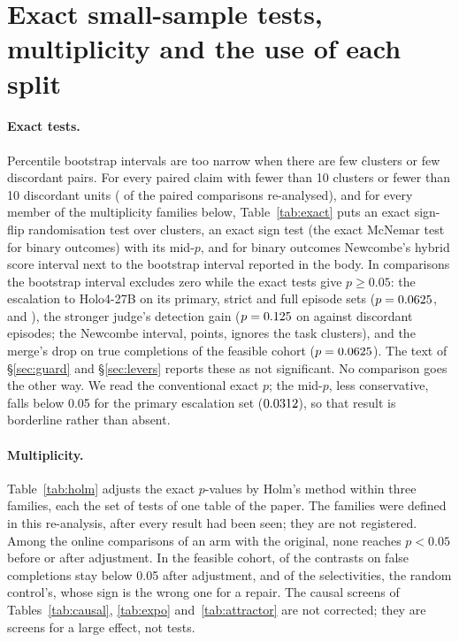 \section{Exact small-sample tests, multiplicity and the use of each split}
\label{app:exact}
\paragraph{Exact tests.} Percentile bootstrap intervals are too narrow when there are few clusters or few discordant pairs. For every paired claim with fewer than 10 clusters or fewer than 10 discordant units (\exNSmall{} of the \exNRows{} paired comparisons re-analysed), and for every member of the multiplicity families below, Table~\ref{tab:exact} puts an exact sign-flip randomisation test over clusters, an exact sign test (the exact McNemar test for binary outcomes) with its mid-$p$, and for binary outcomes Newcombe's hybrid score interval next to the bootstrap interval reported in the body. In \exNDisagree{} comparisons the bootstrap interval excludes zero while the exact tests give $p\geq0.05$: the escalation to Holo4-27B on its primary, strict and full episode sets ($p=0.0625$, \exRbStrictP{} and \exRbAllP), the stronger judge's detection gain ($p=0.125$ on \exGvDetBetter{} against \exGvDetWorse{} discordant episodes; the Newcombe interval, \exGvDetNewcombe{} points, ignores the task clusters), and the merge's drop on true completions of the feasible cohort ($p=0.0625$). The text of \S\ref{sec:guard} and \S\ref{sec:levers} reports these as not significant. No comparison goes the other way. We read the conventional exact $p$; the mid-$p$, less conservative, falls below 0.05 for the primary escalation set ($0.0312$), so that result is borderline rather than absent. %

\paragraph{Multiplicity.} Table~\ref{tab:holm} adjusts the exact $p$-values by Holm's method within three families, each the set of tests of one table of the paper. The families were defined in this re-analysis, after every result had been seen; they are not registered. Among the \exHolmOnlineN{} online comparisons of an arm with the original, none reaches $p<0.05$ before or after adjustment. In the feasible cohort, \exHolmCohortBelow{} of the \exHolmCohortN{} contrasts on false completions stay below 0.05 after adjustment, and \exHolmSelBelow{} of the \exHolmSelN{} selectivities, the random control's, whose sign is the wrong one for a repair. The causal screens of Tables~\ref{tab:causal}, \ref{tab:expo} and~\ref{tab:attractor} are not corrected; they are screens for a large effect, not tests. %
\FloatBarrier

